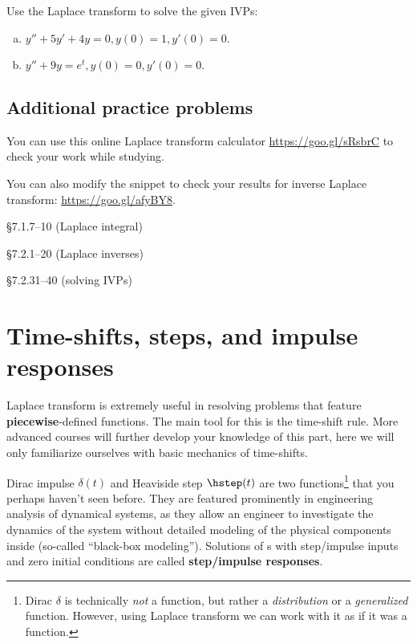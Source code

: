 \begin{question}
Use the Laplace transform to solve the given IVPs:
\begin{enumerate}[(a)]
\item $y''+5y'+4y = 0, y(0)=1, y'(0)=0.$
\item $y''+9y = e^t, y(0)=0, y'(0)=0.$
\end{enumerate}
\end{question}


\subsection*{Additional practice problems}

\begin{fullwidth}
You can use this online Laplace transform calculator \url{https://goo.gl/sRsbrC} to check your work while studying.

You can also modify the \sage snippet to check your results for inverse Laplace transform: \url{https://goo.gl/afyBY8}.
\end{fullwidth}

\begin{colenumerate}
  \item {} \S 7.1.7--10 (Laplace integral)
  \item {} \S 7.2.1--20 (Laplace inverses)
  \item {} \S 7.2.31--40 (solving IVPs)
\end{colenumerate}



\section{Time-shifts, steps, and impulse responses}

\begin{weekintro}
  Laplace transform is extremely useful in resolving problems that feature \textbf{piecewise}-defined functions. The main tool for this is the time-shift rule. More advanced courses will further develop your knowledge of this part, here we will only familiarize ourselves with basic mechanics of time-shifts.

 Dirac impulse \(\delta(t)\) and Heaviside step  \(\hstep(t)\) are two functions\footnote{Dirac \(\delta\) is technically \emph{not} a function, but rather a \emph{distribution} or a \emph{generalized} function. However, using Laplace transform we can work with it as if it was a function.} that you perhaps haven't seen before. They are featured prominently in engineering analysis of dynamical systems, as they allow an engineer to investigate the dynamics of the system without detailed modeling of the physical components inside (so-called ``black-box modeling''). Solutions of \ode{}s with step/impulse inputs and zero initial conditions are called \textbf{step/impulse responses}.
\end{weekintro}

